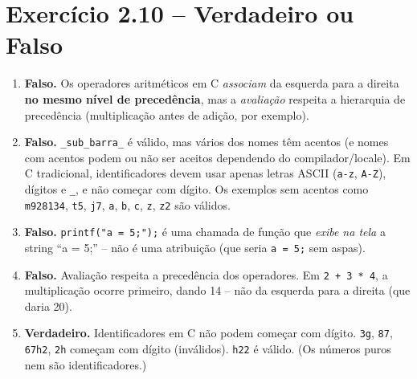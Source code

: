 \documentclass[12pt,a4paper]{article}
\begin{document}
\section{Exercício 2.10 -- Verdadeiro ou Falso}

\begin{respostabox}
\begin{enumerate}[label=\textbf{\alph*)}]

\item \textcolor{deitelred}{\textbf{Falso.}} Os operadores aritméticos em C
\textit{associam} da esquerda para a direita \textbf{no mesmo nível de precedência},
mas a \textit{avaliação} respeita a hierarquia de precedência (multiplicação
antes de adição, por exemplo).

\item \textcolor{deitelred}{\textbf{Falso.}} \texttt{\_sub\_barra\_} é válido,
mas vários dos nomes têm acentos (e nomes com acentos podem ou não ser aceitos
dependendo do compilador/locale). Em C tradicional, identificadores devem usar
apenas letras ASCII (\texttt{a-z}, \texttt{A-Z}), dígitos e \texttt{\_}, e não
começar com dígito. Os exemplos sem acentos como \texttt{m928134}, \texttt{t5},
\texttt{j7}, \texttt{a}, \texttt{b}, \texttt{c}, \texttt{z}, \texttt{z2} são
válidos.

\item \textcolor{deitelred}{\textbf{Falso.}} \texttt{printf("a = 5;");} é uma
chamada de função que \textit{exibe na tela} a string ``a = 5;'' -- não é uma
atribuição (que seria \texttt{a = 5;} sem aspas).

\item \textcolor{deitelred}{\textbf{Falso.}} Avaliação respeita a precedência
dos operadores. Em \texttt{2 + 3 * 4}, a multiplicação ocorre primeiro, dando 14
-- não da esquerda para a direita (que daria 20).

\item \textcolor{deitelgreen}{\textbf{Verdadeiro.}} Identificadores em C não podem
começar com dígito. \texttt{3g}, \texttt{87}, \texttt{67h2}, \texttt{2h} começam
com dígito (inválidos). \texttt{h22} é válido. (Os números puros nem são
identificadores.)

\end{enumerate}
\end{respostabox}

\end{document}
